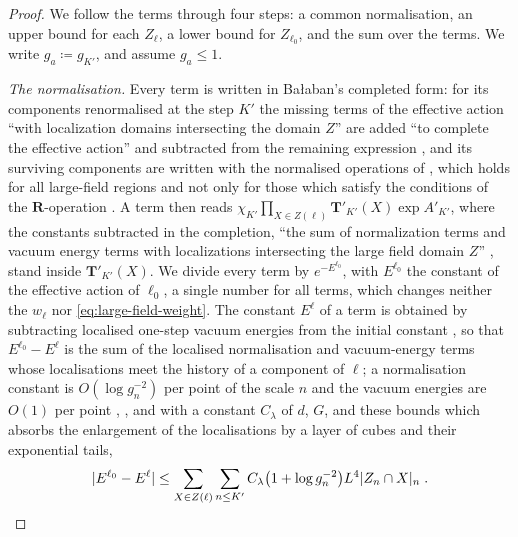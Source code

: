 \documentclass[11pt]{preprint}
\DeclarePairedDelimiter{\abs}{\lvert}{\rvert}
\numberwithin{equation}{section}
\theoremstyle{definition}
\theoremstyle{remark}
\theoremstyle{plain}
\begin{document}
\begin{proof}
We follow the terms through four steps: a common normalisation, an upper bound for each $Z_\ell$, a lower bound for $Z_{\ell_0}$, and the sum over the terms. We write $g_a \coloneqq g_{K'}$, and assume $g_a \leq 1$.

\emph{The normalisation.} Every term is written in Ba{\l}aban's completed form: for its components renormalised at the step $K'$ the missing terms of the effective action ``with localization domains intersecting the domain $Z$'' are added ``to complete the effective action'' and subtracted from the remaining expression \cite[p.~377, (1.70)]{BalabanLFR2}, and its surviving components are written with the normalised operations of \cite[(1.79), p.~383]{BalabanLFR2}, which holds for all large-field regions and not only for those which satisfy the conditions of the $\mathbf R$-operation \cite[p.~383--384]{BalabanLFR2}. A term then reads $\chi_{K'}\prod_{X \in Z(\ell)}\mathbf T'_{K'}(X)\exp A'_{K'}$, where the constants subtracted in the completion, ``the sum of normalization terms and vacuum energy terms with localizations intersecting the large field domain $Z$'' \cite[p.~378]{BalabanLFR2}, stand inside $\mathbf T'_{K'}(X)$. We divide every term by $e^{-E^{\ell_0}}$, with $E^{\ell_0}$ the constant of the effective action of $\ell_0$, a single number for all terms, which changes neither the $w_\ell$ nor \eqref{eq:large-field-weight}. The constant $E^\ell$ of a term is obtained by subtracting localised one-step vacuum energies from the initial constant \cite[p.~262]{BalabanCRE}, so that $E^{\ell_0} - E^\ell$ is the sum of the localised normalisation and vacuum-energy terms whose localisations meet the history of a component of $\ell$; a normalisation constant is $O(\log g_n^{-2})$ per point of the scale $n$ and the vacuum energies are $O(1)$ per point \cite[p.~380]{BalabanLFR2}, \cite[p.~264]{BalabanCRE}, and with a constant $C_\lambda$ of $d$, $G$, and these bounds which absorbs the enlargement of the localisations by a layer of cubes and their exponential tails,
\begin{equation}\label{eq:constant-difference}
    \abs{E^{\ell_0} - E^\ell} \leq \sum_{X \in Z(\ell)}\sum_{n \leq K'}C_\lambda\bigl(1 + \log g_n^{-2}\bigr)L^4\abs{Z_n \cap X}_n\;.
\end{equation}


\end{proof}
\end{document}
